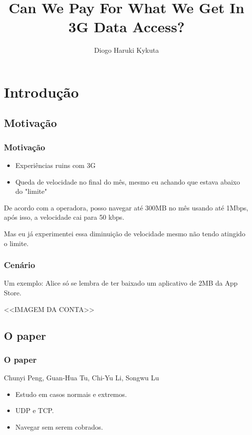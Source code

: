 \documentclass[brazil]{beamer}
\title{Can We Pay For What We Get In 3G Data Access?}
\author{Diogo Haruki Kykuta}
\date{}
\begin{document}
\frame{\titlepage}

\section{Introdução}



\subsection{Motivação}

\begin{frame}[fragile]
    \frametitle{Motivação}
    \begin{itemize}
        \item Experiências ruins com 3G
        \item Queda de velocidade no final do mês, mesmo eu achando que estava abaixo do "limite"
    \end{itemize}
\end{frame}

\begin{frame}[fragile]
    De acordo com a operadora, posso navegar até 300MB no mês usando até 1Mbps, após isso, a velocidade cai
    para 50 kbps.

    \pause
    \vspace{0.4cm}
    Mas eu já experimentei essa diminuição de velocidade mesmo não tendo atingido o limite.
\end{frame}

\begin{frame}[fragile]
    \frametitle{Cenário}
    Um exemplo: Alice só se lembra de ter baixado um aplicativo de 2MB da App Store.

    <<IMAGEM DA CONTA>>
\end{frame}

\subsection{O paper}
\begin{frame}[fragile]
    \frametitle{O paper}
    \begin{center}
        Chunyi Peng, Guan-Hua Tu, Chi-Yu Li, Songwu Lu
    \end{center}
    \vspace{0.4cm}
    \begin{itemize}
        \item Estudo em casos normais e extremos.
        \item UDP e TCP.
        \item Navegar sem serem cobrados.

    \end{itemize}
\end{frame}
\end{document}

